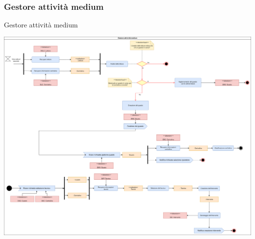 \documentclass{beamer}
\begin{document}
	\begin{frame}
		\subsubsection{Gestore attività medium}	
		\begin{block}{Gestore attività medium}
			\begin{center}
				\includegraphics[width=\textwidth, height=0.85\textheight, keepaspectratio=true]{comp6.png}
			\end{center}
		\end{block}
	\end{frame}	
\end{document}
